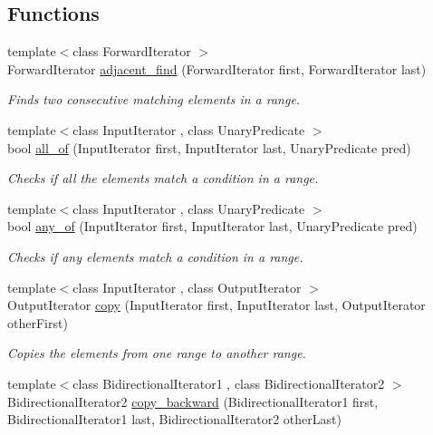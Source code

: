 \subsection*{Functions}
\begin{DoxyCompactItemize}
\item 
{\footnotesize template$<$class Forward\+Iterator $>$ }\\Forward\+Iterator \hyperlink{namespaceprism_a82052418345794a13044c15d8e32dd89}{adjacent\+\_\+find} (Forward\+Iterator first, Forward\+Iterator last)
\begin{DoxyCompactList}\small\item\em Finds two consecutive matching elements in a range. \end{DoxyCompactList}\item 
{\footnotesize template$<$class Input\+Iterator , class Unary\+Predicate $>$ }\\bool \hyperlink{namespaceprism_ad2de9cb16507b1e1b73597c308cafa6c}{all\+\_\+of} (Input\+Iterator first, Input\+Iterator last, Unary\+Predicate pred)
\begin{DoxyCompactList}\small\item\em Checks if all the elements match a condition in a range. \end{DoxyCompactList}\item 
{\footnotesize template$<$class Input\+Iterator , class Unary\+Predicate $>$ }\\bool \hyperlink{namespaceprism_ab06451218f60335b732769b55b683321}{any\+\_\+of} (Input\+Iterator first, Input\+Iterator last, Unary\+Predicate pred)
\begin{DoxyCompactList}\small\item\em Checks if any elements match a condition in a range. \end{DoxyCompactList}\item 
{\footnotesize template$<$class Input\+Iterator , class Output\+Iterator $>$ }\\Output\+Iterator \hyperlink{namespaceprism_ae776f4cd825f79e7af1cf6ee1d90a209}{copy} (Input\+Iterator first, Input\+Iterator last, Output\+Iterator other\+First)
\begin{DoxyCompactList}\small\item\em Copies the elements from one range to another range. \end{DoxyCompactList}\item 
{\footnotesize template$<$class Bidirectional\+Iterator1 , class Bidirectional\+Iterator2 $>$ }\\Bidirectional\+Iterator2 \hyperlink{namespaceprism_a2564c63b76369cc81ff725a56e818046}{copy\+\_\+backward} (Bidirectional\+Iterator1 first, Bidirectional\+Iterator1 last, Bidirectional\+Iterator2 other\+Last)

\end{DoxyCompactItemize}
